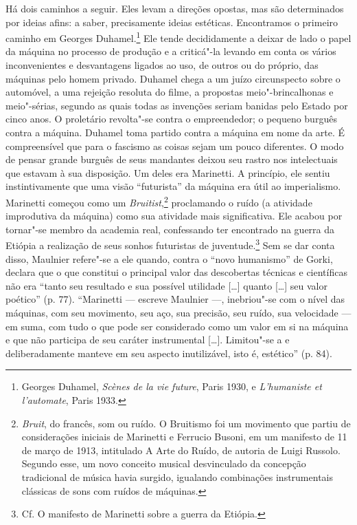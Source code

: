 Há dois caminhos a seguir. Eles levam a direções opostas, mas são
determinados por ideias afins: a saber, precisamente ideias estéticas.
Encontramos o primeiro caminho em Georges Duhamel.\footnote{Georges
  Duhamel, \emph{Scènes de la vie future}, Paris 1930, e
  \emph{L'humaniste et l'automate}, Paris 1933. \versal{[N. A.]}} Ele tende
decididamente a deixar de lado o papel da máquina no processo de
produção e a criticá"-la levando em conta os vários inconvenientes e
desvantagens ligados ao uso, de outros ou do próprio, das máquinas pelo
homem privado. Duhamel chega a um juízo circunspecto sobre o automóvel,
a uma rejeição resoluta do filme, a propostas meio"-brincalhonas e
meio"-sérias, segundo as quais todas as invenções seriam banidas pelo
Estado por cinco anos. O proletário revolta"-se contra o empreendedor; o
pequeno burguês contra a máquina. Duhamel toma partido contra a máquina
em nome da arte. É compreensível que para o fascismo as coisas sejam um
pouco diferentes. O modo de pensar grande burguês de seus mandantes
deixou seu rastro nos intelectuais que estavam à sua disposição. Um
deles era Marinetti. A princípio, ele sentiu instintivamente que uma
visão ``futurista'' da máquina era útil ao imperialismo. Marinetti começou
como um \emph{Bruitist},\footnote{\emph{Bruit}, do francês, som ou
  ruído. O Bruitismo foi um movimento que partiu de considerações
  iniciais de Marinetti e Ferrucio Busoni, em um manifesto de 11 de
  março de 1913, intitulado A Arte do Ruído, de autoria de Luigi
  Russolo. Segundo esse, um novo conceito musical desvinculado da
  concepção tradicional de música havia surgido, igualando combinações
  instrumentais clássicas de sons com ruídos de máquinas. \versal{[N. E.]}} proclamando
o ruído (a atividade improdutiva da máquina) como sua atividade mais
significativa. Ele acabou por tornar"-se membro da academia real,
confessando ter encontrado na guerra da Etiópia a realização de seus
sonhos futuristas de juventude.\footnote{Cf. O manifesto de
  Marinetti sobre a guerra da Etiópia. \versal{[N. A.]}} Sem se dar conta disso,
Maulnier refere"-se a ele quando, contra o ``novo humanismo'' de Gorki,
declara que o que constitui o principal valor das descobertas técnicas e
científicas não era ``tanto seu resultado e sua possível utilidade
{[}\ldots{}{]} quanto {[}\ldots{}{]} seu valor poético'' (p. 77). ``Marinetti ---
escreve Maulnier ---, inebriou"-se com o nível das máquinas, com seu
movimento, seu aço, sua precisão, seu ruído, sua velocidade --- em suma,
com tudo o que pode ser considerado como um valor em si na máquina e que
não participa de seu caráter instrumental {[}\ldots{}{]}. Limitou"-se a e
deliberadamente manteve em seu aspecto inutilizável, isto é, estético''
(p. 84).

